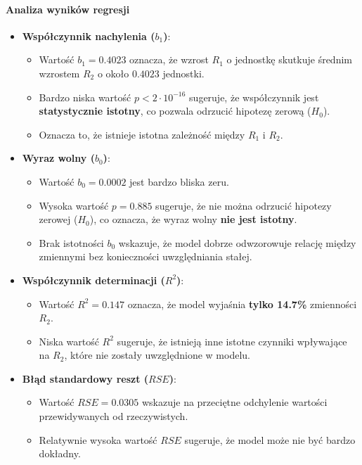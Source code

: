 \documentclass[12pt]{article}
\begin{document}
\paragraph{Analiza wyników regresji}
\begin{itemize}
    \item \textbf{Współczynnik nachylenia (\(b_1\))}:
    \begin{itemize}
        \item Wartość \(b_1 = 0.4023\) oznacza, że wzrost \(R_1\) o jednostkę skutkuje średnim wzrostem \(R_2\) o około \(0.4023\) jednostki.
        \item Bardzo niska wartość \(p < 2 \cdot 10^{-16}\) sugeruje, że współczynnik jest \textbf{statystycznie istotny}, co pozwala odrzucić hipotezę zerową (\(H_0\)).
        \item Oznacza to, że istnieje istotna zależność między \(R_1\) i \(R_2\).
    \end{itemize}
    
    \item \textbf{Wyraz wolny (\(b_0\))}:
    \begin{itemize}
        \item Wartość \(b_0 = 0.0002\) jest bardzo bliska zeru.
        \item Wysoka wartość \(p = 0.885\) sugeruje, że nie można odrzucić hipotezy zerowej (\(H_0\)), co oznacza, że wyraz wolny \textbf{nie jest istotny}.
        \item Brak istotności \(b_0\) wskazuje, że model dobrze odwzorowuje relację między zmiennymi bez konieczności uwzględniania stałej.
    \end{itemize}
    
    \item \textbf{Współczynnik determinacji (\(R^2\))}:
    \begin{itemize}
        \item Wartość \(R^2 = 0.147\) oznacza, że model wyjaśnia \textbf{tylko 14.7\%} zmienności \(R_2\).
        \item Niska wartość \(R^2\) sugeruje, że istnieją inne istotne czynniki wpływające na \(R_2\), które nie zostały uwzględnione w modelu.
    \end{itemize}
    
    \item \textbf{Błąd standardowy reszt (\(RSE\))}:
    \begin{itemize}
        \item Wartość \(RSE = 0.0305\) wskazuje na przeciętne odchylenie wartości przewidywanych od rzeczywistych.
        \item Relatywnie wysoka wartość \(RSE\) sugeruje, że model może nie być bardzo dokładny.
    \end{itemize}
\end{itemize}
\end{document}
